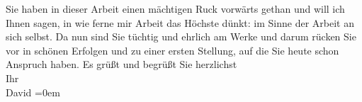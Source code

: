 \begin{ledgroupsized}[t]{13cm}
               Sie haben in dieser Arbeit einen
               mächtigen Ruck vorwärts gethan und will ich Ihnen sagen, in wie ferne mir Arbeit das
               Höchste dünkt: im Sinne der Arbeit an sich selbst. Da nun sind Sie tüchtig und
               ehrlich am Werke und darum rücken Sie vor in schönen Erfolgen und zu einer ersten
               Stellung, auf die Sie heute schon Anspruch haben.\pend
           \pstart
           Es grüßt und begrüßt Sie herzlichst{\\[\baselineskip]}Ihr{\\[\baselineskip]}\spacefill\mbox{David}\pend
           \leftskip=0em{}\endnumbering{}\end{ledgroupsized}  \newcommand{\dateiname}{L00411}\newcommand{\titel}{Jakob Julius David an Arthur Schnitzler, 23. 12. 1894}\newcommand{\editorInnen}{Martin Anton Müller und Gerd-Hermann Susen}
      